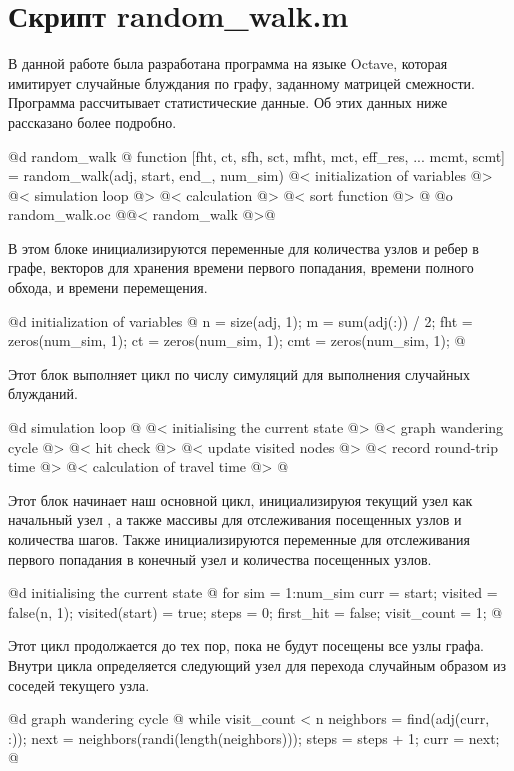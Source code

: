 \documentclass[utf8x]{G7-32} %
\begin{document}
\section{Скрипт random_walk.m}
В данной работе была разработана программа на языке Octave, которая имитирует случайные блуждания по графу, заданному матрицей смежности. Программа рассчитывает статистические данные. Об этих данных ниже рассказано более подробно. 


@d random_walk @{
function [fht, ct, sfh, sct, mfht, mct, eff_res, ...
mcmt, scmt] = random_walk(adj, start, end_, num_sim)
@< initialization of variables @>
@< simulation loop @>
@< calculation @>
@< sort function @>
@}
@o random_walk.oc @{@< random_walk  @>@}



В этом блоке инициализируются переменные для количества узлов и ребер в графе, векторов для хранения времени первого попадания, времени полного обхода, и времени перемещения.

@d initialization of variables @{
    n = size(adj, 1);
    m = sum(adj(:)) / 2;
    fht = zeros(num_sim, 1);
    ct = zeros(num_sim, 1);
    cmt = zeros(num_sim, 1);
@}

Этот блок выполняет цикл по числу симуляций для выполнения случайных блужданий.

@d simulation loop @{
@< initialising the current state @>
@< graph wandering cycle @>
@< hit check @>
@< update visited nodes @>
@< record round-trip time @>
@< calculation of travel time @>
@}

Этот блок начинает наш основной цикл, инициализируюя текущий узел как начальный узел , а также массивы для отслеживания посещенных узлов и количества шагов. Также инициализируются переменные для отслеживания первого попадания в конечный узел и количества посещенных узлов.

@d initialising the current state @{
    for sim = 1:num_sim
        curr = start;
        visited = false(n, 1);
        visited(start) = true;
        steps = 0;
        first_hit = false;
        visit_count = 1;
@}

Этот цикл продолжается до тех пор, пока не будут посещены все узлы графа. Внутри цикла определяется следующий узел для перехода случайным образом из соседей текущего узла.

@d graph wandering cycle @{
        while visit_count < n
            neighbors = find(adj(curr, :));
            next = neighbors(randi(length(neighbors)));
            steps = steps + 1;
            curr = next;
@}
\end{document}
